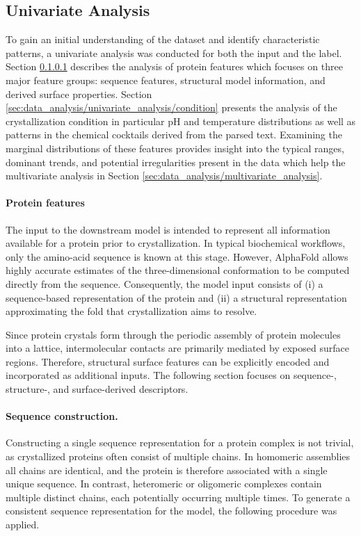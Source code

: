 \subsection{Univariate Analysis}\label{sec:data_analysis/univariate_analysis}
To gain an initial understanding of the dataset and identify characteristic patterns, a univariate analysis was conducted for both the input and the label. Section \ref{sec:data_analysis/univariate_analysis/protein} describes the analysis of protein features which focuses on three major feature groups: sequence features, structural model information, and derived surface properties. Section \ref{sec:data_analysis/univariate_analysis/condition} presents the analysis of the crystallization condition in particular pH and temperature distributions as well as patterns in the chemical cocktails derived from the parsed text. Examining the marginal distributions of these features provides insight into the typical ranges, dominant trends, and potential irregularities present in the data which help the multivariate analysis in Section \ref{sec:data_analysis/multivariate_analysis}.

\paragraph{Protein features}\label{sec:data_analysis/univariate_analysis/protein}
The input to the downstream model is intended to represent all information available for a protein prior to crystallization. In typical biochemical workflows, only the amino-acid sequence is known at this stage. However, AlphaFold allows highly accurate estimates of the three-dimensional conformation to be computed directly from the sequence. Consequently, the model input consists of (i) a sequence-based representation of the protein and (ii) a structural representation approximating the fold that crystallization aims to resolve.

Since protein crystals form through the periodic assembly of protein molecules into a lattice, intermolecular contacts are primarily mediated by exposed surface regions. Therefore, structural surface features can be explicitly encoded and incorporated as additional inputs. The following section focuses on sequence-, structure-, and surface-derived descriptors.

\paragraph{Sequence construction.}
Constructing a single sequence representation for a protein complex is not trivial, as crystallized proteins often consist of multiple chains. In homomeric assemblies all chains are identical, and the protein is therefore associated with a single unique sequence. In contrast, heteromeric or oligomeric complexes contain multiple distinct chains, each potentially occurring multiple times. To generate a consistent sequence representation for the model, the following procedure was applied.

